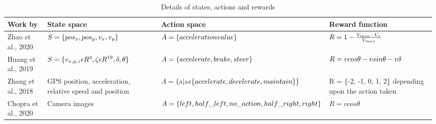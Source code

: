 \begin{table}[h]
	\centering
	\caption{Details of states, actions and rewards }
	\smallskip
	\begin{tabular}{ |p{2cm}|p{3.5cm}|p{3.5cm}|p{3cm}|  }
		
		
		\hline
		\textbf{Work by}  & \textbf{State space}  &\textbf{Action space} &\textbf{Reward function} \\		
		\hline
		\hline
		Zhao et al., 2020\cite{zhao2020deep} & $S = \newline \{ pos_x, pos_y, v_x, v_y \}$ &$A = \newline \{acceleration \newline value\} $ & $\newline R = 1 - \frac{V_{max} - V_x}{V_{max}}$\\
		\hline
		Huang et al., 2019\cite{huang2019end} & $S = \newline \{v_{x,y,z}\epsilon R^3, \zeta\epsilon R^{19}, \newline \delta, \theta \}$   & $A=\{ accelerate, \newline brake, steer\} $ & $R = vcos\theta \newline - vsin\theta - v\delta$\\
		\hline
		Zhang et al., 2018\cite{zhang2018human}& GPS position, \newline acceleration, relative speed and position & $A = \{ $a$ | $a$\epsilon \newline \{accelerate, \newline decelerate, \newline maintain\}\}$ &R = \{-2, -1, 0, 1, 2\} depending upon the action taken\\
		\hline
		Chopra et al., 2020\cite{chopra2020end}&Camera images & $A = \newline \{left, half\_left, \newline no\_action, \newline half\_right, right \} $ & $R = vcos \theta $ \\
		\hline
	\end{tabular}
	\label{table:0}
\end{table}


%
%
%
